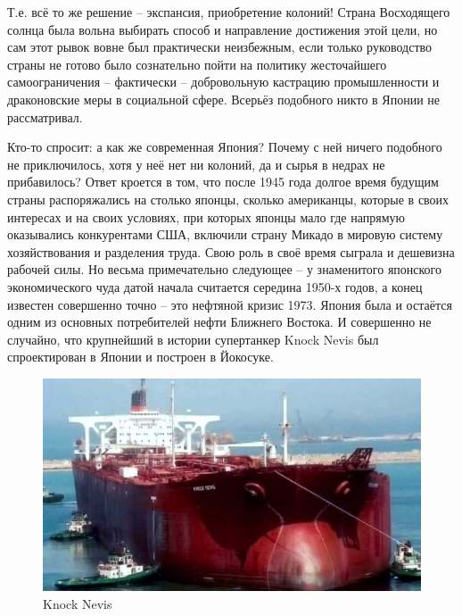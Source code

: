 Т.е. всё то же решение – экспансия, приобретение колоний! Страна Восходящего солнца была вольна выбирать способ и направление достижения этой цели, но сам этот рывок вовне был практически неизбежным, если только руководство страны не готово было сознательно пойти на политику жесточайшего самоограничения – фактически – добровольную кастрацию промышленности и драконовские меры в социальной сфере. Всерьёз подобного никто в Японии не рассматривал.

Кто-то спросит: а как же современная Япония? Почему с ней ничего подобного не приключилось, хотя у неё нет ни колоний, да и сырья в недрах не прибавилось? Ответ кроется в том, что после 1945 года долгое время будущим страны распоряжались на столько японцы, сколько американцы, которые в своих интересах и на своих условиях, при которых японцы мало где напрямую оказывались конкурентами США, включили страну Микадо в мировую систему хозяйствования и разделения труда. Свою роль в своё время сыграла и дешевизна рабочей силы. Но весьма примечательно следующее – у знаменитого японского экономического чуда датой начала считается середина 1950-х годов, а конец известен совершенно точно – это нефтяной кризис 1973. Япония была и остаётся одним из основных потребителей нефти Ближнего Востока. И совершенно не случайно, что крупнейший в истории супертанкер Knock Nevis был спроектирован в Японии и построен в Йокосуке. 

\begin{figure}[h!tb] 
	\centering\includegraphics[scale=0.4]{Glava1/L-8_vonVRG0.jpg}
	\caption{Knock Nevis}%
\end{figure}

